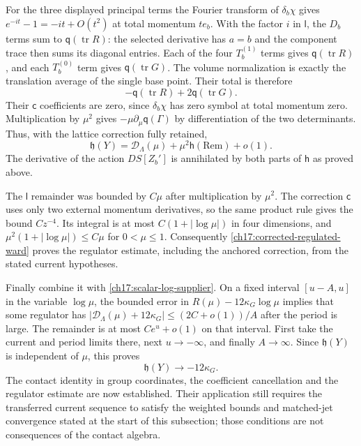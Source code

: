 For the three displayed principal terms the Fourier transform of
$\delta_b\chi$ gives $e^{-it}-1=-it+O(t^2)$ at total momentum
$te_b$. With the factor $i$ in $\mathsf l$, the $D_b$ terms sum to
$\mathsf q(\operatorname{tr}R)$: the selected derivative has $a=b$
and the component trace then sums its diagonal entries. Each of the
four $T_b^{(1)}$ terms gives $\mathsf q(\operatorname{tr}R)$, and each
$T_b^{(0)}$ term gives $\mathsf q(\operatorname{tr}G)$.
The volume normalization is exactly the translation average of the
single base point. Their total is therefore
\[
           -\mathsf q(\operatorname{tr}R)
                              +2\mathsf q(\operatorname{tr}G).
\]
Their $\mathsf c$ coefficients are zero, since $\delta_b\chi$ has
zero symbol at total momentum zero. Multiplication by $\mu^2$ gives
$-\mu\partial_\mu\mathsf q(\Gamma)$ by differentiation of the two
determinants. Thus, with the lattice correction fully retained,
\begin{equation}
 \mathfrak h(Y)=\mathcal D_\Lambda(\mu)
                  +\mu^2\mathsf h(\mathrm{Rem})+o(1).
 \label{ch17:corrected-regulated-ward}
\end{equation}
The derivative of the action $DS[Z_b']$ is annihilated by both parts of
$\mathsf h$ as proved above.

The $\mathsf l$ remainder was bounded by $C\mu$ after multiplication
by $\mu^2$. The correction $\mathsf c$ uses only two external momentum
derivatives, so the same product rule gives the bound $Cz^{-4}$. Its integral
is at most $C(1+|\log\mu|)$ in four dimensions, and
$\mu^2(1+|\log\mu|)\le C\mu$ for $0<\mu\le1$.
Consequently \eqref{ch17:corrected-regulated-ward} proves the regulator
estimate, including the anchored correction, from the stated current
hypotheses.

Finally combine it with \eqref{ch17:scalar-log-supplier}. On a fixed
interval $[u-A,u]$ in the variable $\log\mu$, the bounded error in
$R(\mu)-12\kappa_G\log\mu$ implies that some regulator has
$|\mathcal D_\Lambda(\mu)+12\kappa_G|\le(2C+o(1))/A$ after the
period is large. The remainder is at most $Ce^u+o(1)$ on that interval.
First take the current and period limits there, next $u\to-\infty$,
and finally $A\to\infty$. Since $\mathfrak h(Y)$ is independent of
$\mu$, this proves
\[
                         \mathfrak h(Y)\longrightarrow-12\kappa_G.
\]
The contact identity in group coordinates, the coefficient cancellation and the
regulator estimate are now established. Their application still requires
the transferred current sequence to satisfy the weighted bounds
and matched-jet convergence stated at the start of this subsection;
those conditions are not consequences of the contact algebra.
